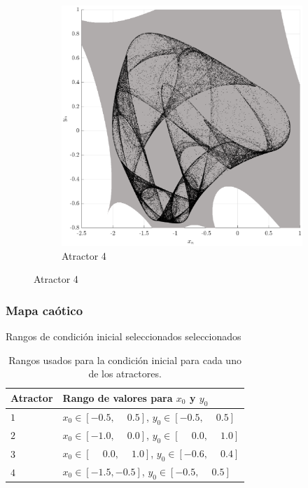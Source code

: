 \documentclass[10pt]{beamer}
\begin{document}
\begin{frame}
\begin{figure}[hbtp]
\begin{subfigure}[b]{0.475\textwidth}
                \includegraphics[width=\textwidth,trim=70 0 70 0,clip]{H4_map4}
                \caption{Atractor 4}    
                \label{fig:mapa_h4}
            \end{subfigure}
        \end{figure}
\end{frame}



\begin{frame}
    \frametitle{Mapa caótico}
    \begin{block}{Rangos de condición inicial seleccionados seleccionados}
        \justifying
        \begin{table}[htbp]
            \centering
            \caption{Rangos usados para la condición inicial para cada uno de los atractores.}
            \begin{tabular}{|l|l|}
                \hline
                \rowcolor{lightgray} Atractor  & Rango de valores para $x_{0}$ y $y_{0}$ \\
                \hline
                $1$  & $x_{0} \in [-0.5, \phantom{-} 0.5]$, $y_{0} \in [-0.5, \phantom{-}0.5]$ \\
                \hline
                $2$  & $x_{0} \in [-1.0, \phantom{-} 0.0]$, $y_{0} \in [\phantom{-}0.0, \phantom{-}1.0]$ \\
                \hline
                $3$  & $x_{0} \in [\phantom{-}0.0, \phantom{-} 1.0]$, $y_{0} \in [-0.6, \phantom{-}0.4]$ \\
                \hline
                $4$  & $x_{0} \in [-1.5, -0.5]$, $y_{0} \in [-0.5, \phantom{-}0.5]$ \\
                \hline
            \end{tabular}
            \label{tab:rangos_mapas}
        \end{table} 
        \end{block}
\end{frame}
\end{document}
